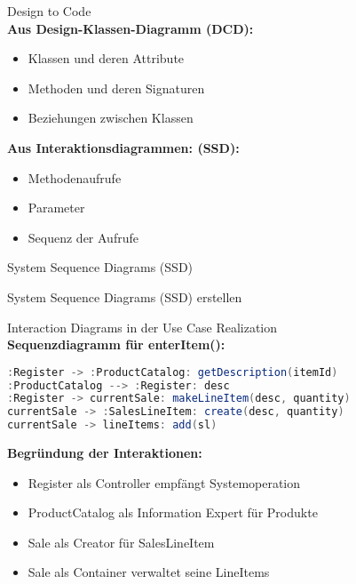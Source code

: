 \begin{KR}{Design to Code}\\
\textbf{Aus Design-Klassen-Diagramm (DCD):}
\begin{itemize}
    \item Klassen und deren Attribute
    \item Methoden und deren Signaturen
    \item Beziehungen zwischen Klassen
\end{itemize}

\textbf{Aus Interaktionsdiagrammen: (SSD):}
\begin{itemize}
    \item Methodenaufrufe
    \item Parameter
    \item Sequenz der Aufrufe
\end{itemize}
\end{KR}

\begin{concept}{System Sequence Diagrams (SSD)}
\end{concept}

\begin{KR}{System Sequence Diagrams (SSD) erstellen}
\end{KR}


\begin{example2}{Interaction Diagrams in der Use Case Realization}\\
\textbf{Sequenzdiagramm für enterItem():}

\begin{lstlisting}[language=Java, style=basesmol]
:Register -> :ProductCatalog: getDescription(itemId)
:ProductCatalog --> :Register: desc
:Register -> currentSale: makeLineItem(desc, quantity)
currentSale -> :SalesLineItem: create(desc, quantity)
currentSale -> lineItems: add(sl)
\end{lstlisting}

\textbf{Begründung der Interaktionen:}
\begin{itemize}
    \item Register als Controller empfängt Systemoperation
    \item ProductCatalog als Information Expert für Produkte
    \item Sale als Creator für SalesLineItem
    \item Sale als Container verwaltet seine LineItems
\end{itemize}
\end{example2}

